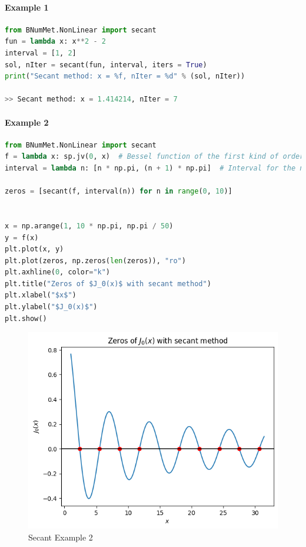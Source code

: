 \paragraph{Example 1}{
\begin{lstlisting}[language=Python]
from BNumMet.NonLinear import secant
fun = lambda x: x**2 - 2
interval = [1, 2]
sol, nIter = secant(fun, interval, iters = True)
print("Secant method: x = %f, nIter = %d" % (sol, nIter))

>> Secant method: x = 1.414214, nIter = 7
\end{lstlisting}
}
\paragraph{Example 2}{
\begin{lstlisting}[language=Python]
from BNumMet.NonLinear import secant
f = lambda x: sp.jv(0, x)  # Bessel function of the first kind of order 0
interval = lambda n: [n * np.pi, (n + 1) * np.pi]  # Interval for the n-th zero

zeros = [secant(f, interval(n)) for n in range(0, 10)]


x = np.arange(1, 10 * np.pi, np.pi / 50)
y = f(x)
plt.plot(x, y)
plt.plot(zeros, np.zeros(len(zeros)), "ro")
plt.axhline(0, color="k")
plt.title("Zeros of $J_0(x)$ with secant method")
plt.xlabel("$x$")
plt.ylabel("$J_0(x)$")
plt.show()
\end{lstlisting}
\begin{figure}[H]
    \centering
    \includegraphics{Include/Images/Thesis/Documentation/NonLinear/Secant Example 2.png}
    \caption{Secant Example 2}
    \label{fig:Secant Example 2}
\end{figure}
}